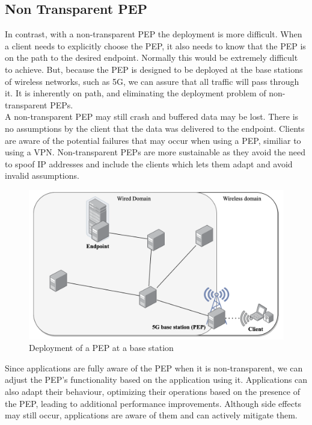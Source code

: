 \documentclass[a4paper,english, 11pt]{report}
\begin{document}
\subsection{Non Transparent PEP}
In contrast, with a non-transparent PEP the deployment is more difficult. When a client needs to explicitly choose the PEP, it also needs to know that the PEP is on the path to the desired endpoint. Normally this would be extremely difficult to achieve. But, because the PEP is designed to be deployed at the base stations of wireless networks, such as 5G, we can assure that all traffic will pass through it. It is inherently on path, and eliminating the deployment problem of non-transparent PEPs.\\

A non-transparent PEP may still crash and buffered data may be lost. There is no assumptions by the client that the data was delivered to the endpoint. Clients are aware of the potential failures that may occur when using a PEP, similiar to using a VPN. Non-transparent PEPs are more sustainable as they avoid the need to spoof IP addresses and include the clients which lets them adapt and avoid invalid assumptions.\\


\begin{figure} %
	\centering
	\includegraphics[scale=0.55]{../diagrams/drawio/deployment.png}
  	\caption{Deployment of a PEP at a base station}
  	\label{fig:pep_deployment}
\end{figure}


Since applications are fully aware of the PEP when it is non-transparent, we can adjust the PEP's functionality based on the application using it. Applications can also adapt their behaviour, optimizing their operations based on the presence of the PEP, leading to additional performance improvements. Although side effects may still occur, applications are aware of them and can actively mitigate them.\\
\end{document}
